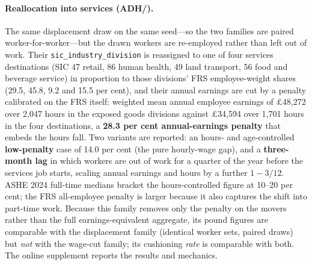 \paragraph{Reallocation into services (ADH/\citealp{autor2014}).} The same displacement draw on the same seed---so the two families are paired worker-for-worker---but the drawn workers are re-employed rather than left out of work. Their \texttt{sic\_industry\_division} is reassigned to one of four services destinations (SIC 47 retail, 86 human health, 49 land transport, 56 food and beverage service) in proportion to those divisions' FRS employee-weight shares (29.5, 45.8, 9.2 and 15.5 per cent), and their annual earnings are cut by a penalty calibrated on the FRS itself: weighted mean annual employee earnings of \pounds 48{,}272 over 2{,}047 hours in the exposed goods divisions against \pounds 34{,}594 over 1{,}701 hours in the four destinations, a \textbf{28.3 per cent annual-earnings penalty} that embeds the hours fall. Two variants are reported: an hours- and age-controlled \textbf{low-penalty} case of 14.0 per cent (the pure hourly-wage gap), and a \textbf{three-month lag} in which workers are out of work for a quarter of the year before the services job starts, scaling annual earnings and hours by a further $1-3/12$. ASHE 2024 full-time medians bracket the hours-controlled figure at 10--20 per cent; the FRS all-employee penalty is larger because it also captures the shift into part-time work. Because this family removes only the penalty on the movers rather than the full earnings-equivalent aggregate, its pound figures are comparable with the displacement family (identical worker sets, paired draws) but \emph{not} with the wage-cut family; its cushioning \emph{rate} is comparable with both. The online supplement reports the results and mechanics.


